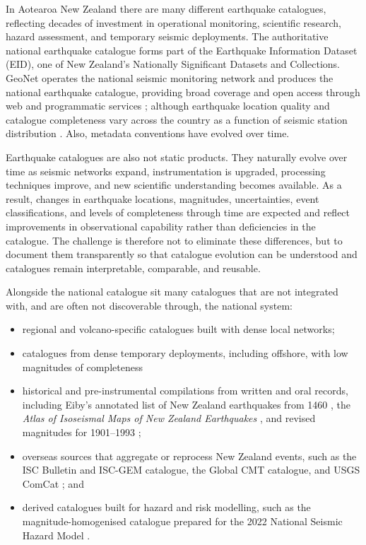 \documentclass[11pt]{article}
\begin{document}
In Aotearoa New Zealand there are many different earthquake catalogues, reflecting decades of investment in operational monitoring, scientific research, hazard assessment, and temporary seismic deployments. The authoritative national earthquake catalogue forms part of the Earthquake Information Dataset (EID), one of New Zealand's Nationally Significant Datasets and Collections.  GeoNet operates the national seismic monitoring network and produces the national earthquake catalogue, providing broad coverage and open access through web and programmatic services \citep{GeoNetEqCatalogue, GeoNetFDSN, GeoNetAPI}; although earthquake location quality and catalogue completeness vary  across the country as a function of seismic station distribution \citep{WarrenSmith2025}. Also, metadata conventions have evolved over time. 

Earthquake catalogues are also not static products. They naturally evolve over time as seismic networks expand, instrumentation is upgraded, processing techniques improve, and new scientific understanding becomes available. As a result, changes in earthquake locations, magnitudes, uncertainties, event classifications, and levels of completeness through time are expected and reflect improvements in observational capability rather than deficiencies in the catalogue. The challenge is therefore not to eliminate these differences, but to document them transparently so that catalogue evolution can be understood and catalogues remain interpretable, comparable, and reusable.

Alongside the national catalogue sit many catalogues that are not integrated with, and are often not discoverable through, the national system:
\begin{itemize}
\setlength{\itemsep}{1pt}
\item regional and volcano-specific catalogues built with dense local networks;
\item catalogues from dense temporary deployments, including offshore, with low magnitudes of completeness
\item historical and pre-instrumental compilations from written and oral records, including Eiby's annotated list of New Zealand earthquakes from 1460 \citep{Eiby1968a}, the \emph{Atlas of Isoseismal Maps of New Zealand Earthquakes} \citep{Downes1995}, and revised magnitudes for 1901--1993 \citep{Dowrick1998};  
\item overseas sources that aggregate or reprocess New Zealand events, such as the ISC Bulletin and ISC-GEM catalogue, the Global CMT catalogue, and USGS ComCat \citep{isc_data_collection, Ekstrom2012, usgs_comcat}; and
\item derived catalogues built for hazard and risk modelling, such as the magnitude-homogenised catalogue prepared for the 2022 National Seismic Hazard Model \citep{Christophersen2024}.
\end{itemize}
\end{document}
